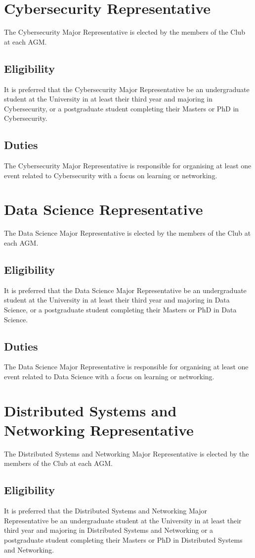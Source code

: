 \documentclass[11pt]{article}
\begin{document}
\section{Cybersecurity Representative}
The Cybersecurity Major Representative is elected by the members of the Club at each AGM.
\subsection{Eligibility}
It is preferred that the Cybersecurity Major Representative be an undergraduate student at the University in at least their third year and majoring in Cybersecurity, or a postgraduate student completing their Masters or PhD in Cybersecurity.
\subsection{Duties}
The Cybersecurity Major Representative is responsible for organising at least one event related to Cybersecurity with a focus on learning or networking.

\section{Data Science Representative}
The Data Science Major Representative is elected by the members of the Club at each AGM.
\subsection{Eligibility}
It is preferred that the Data Science Major Representative be an undergraduate student at the University in at least their third year and majoring in Data Science, or a postgraduate student completing their Masters or PhD in Data Science.
\subsection{Duties}
The Data Science Major Representative is responsible for organising at least one event related to Data Science with a focus on learning or networking.

\section{Distributed Systems and Networking Representative}
The Distributed Systems and Networking Major Representative is elected by the members of the Club at each AGM. 
\subsection{Eligibility}
It is preferred that the Distributed Systems and Networking Major Representative be an undergraduate student at the University in at least their third year and majoring in Distributed Systems and Networking  or a postgraduate student completing their Masters or PhD in Distributed Systems and Networking.
\end{document}
